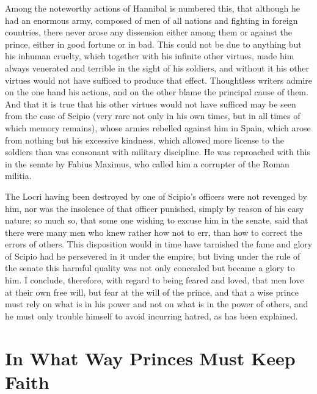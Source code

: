 \documentclass[12pt,letterpaper]{memoir}
\begin{document}
Among the noteworthy actions of Hannibal is numbered this, that
although he had an enormous army, composed of men of all nations
and fighting in foreign countries, there never arose any dissension
either among them or against the prince, either in good fortune or in
bad. This could not be due to anything but his inhuman cruelty, which
together with his infinite other virtues, made him always venerated
and terrible in the sight of his soldiers, and without it his other
virtues would not have sufficed to produce that effect. Thoughtless
writers admire on the one hand his actions, and on the other blame the
principal cause of them. And that it is true that his other virtues
would not have sufficed may be seen from the case of Scipio (very rare
not only in his own times, but in all times of which memory remains),
whose armies rebelled against him in Spain, which arose from nothing
but his excessive kindness, which allowed more license to the soldiers
than was consonant with military discipline. He was reproached with
this in the senate by Fabius Maximus, who called him a corrupter of the
Roman militia.

The Locri having been destroyed by one of Scipio's officers were not
revenged by him, nor was the insolence of that officer punished,
simply by reason of his easy nature; so much so, that some one wishing
to excuse him in the senate, said that there were many men who knew
rather how not to err, than how to correct the errors of others. This
disposition would in time have tarnished the fame and glory of Scipio
had he persevered in it under the empire, but living under the rule of
the senate this harmful quality was not only concealed but became a
glory to him. I conclude, therefore, with regard to being feared and
loved, that men love at their own free will, but fear at the will of
the prince, and that a wise prince must rely on what is in his power
and not on what is in the power of others, and he must only trouble
himself to avoid incurring hatred, as has been explained.

\chapter{In What Way Princes Must Keep Faith}
\end{document}
